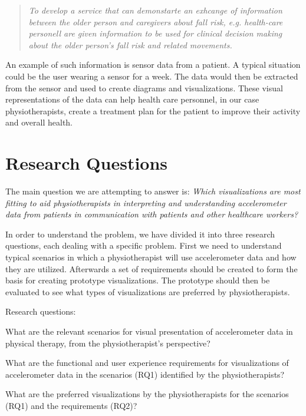 \begin{quote}
\textit{To develop a service that can demonstarte an exhcange of information between the older person and caregivers about fall risk, e.g. health-care personell are given information to be used for clinical decision making about the older person's fall risk and related movements.}
\end{quote}

An example of such information is sensor data from a patient. A typical situation could be the user wearing a sensor for a week. The data would then be extracted from the sensor and used to create diagrams and visualizations. These visual representations of the data can help health care personnel, in our case physiotherapists, create a treatment plan for the patient to improve their activity and overall health. 

\section{Research Questions}
\label{sec:researchQuestions}
The main question we are attempting to answer is: \textit{Which visualizations are most fitting to aid physiotherapists in interpreting and understanding accelerometer data from patients in communication with patients and other healthcare workers?}

In order to understand the problem, we have divided it into three research questions, each dealing with a specific problem. First we need to understand typical scenarios in which a physiotherapist will use accelerometer data and how they are utilized. Afterwards a set of requirements should be created to form the basis for creating prototype visualizations. The prototype should then be evaluated to see what types of visualizations are preferred by physiotherapists.
\clearpage

Research questions:
\begin{description}[parsep=0pt, itemsep=0pt]
\item[Research Question 1:] What are the relevant scenarios for visual presentation of accelerometer data in physical therapy, from the physiotherapist's perspective?

\item[Research Question 2:] What are the functional and user experience requirements for visualizations of accelerometer data in the scenarios (RQ1) identified by the physiotherapists?

\item[Research Question 3:] What are the preferred visualizations by the physiotherapists for the scenarios (RQ1) and the requirements (RQ2)?
\end{description}

